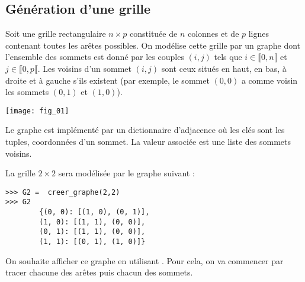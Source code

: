 %
\setcounter{numques}{0}


\subsection*{Génération d'une grille}

Soit une grille rectangulaire $n\times p$ constituée de $n$ colonnes et de $p$ lignes contenant toutes les arêtes possibles. On modélise cette grille par un graphe dont l'ensemble des sommets est donné par les couples $(i,j)$ tels que $i\in\llbracket 0,n \llbracket $ et $j\in\llbracket 0,p \llbracket $. Les voisins d'un sommet $(i,j)$ sont ceux situés en haut, en bas, à droite et à gauche s'ils existent (par exemple, le sommet $(0,0)$ a comme voisin les sommets $(0,1)$ et $(1,0)$).



\begin{center}
\texttt{[image: fig\_01]}
\end{center}

Le graphe est implémenté par un dictionnaire d'adjacence où les clés sont les tuples, coordonnées d'un sommet. La valeur associée est une liste des sommets voisins. 



\begin{exemple}
La grille $ 2 \times 2$ sera modélisée par le graphe suivant :

\begin{lstlisting}
>>> G2 =  creer_graphe(2,2)
>>> G2
        {(0, 0): [(1, 0), (0, 1)],
        (1, 0): [(1, 1), (0, 0)],
        (0, 1): [(1, 1), (0, 0)],
        (1, 1): [(0, 1), (1, 0)]}
\end{lstlisting}
\end{exemple}

On souhaite afficher ce graphe en utilisant . Pour cela, on va commencer par tracer chacune des arêtes puis chacun des sommets. 

